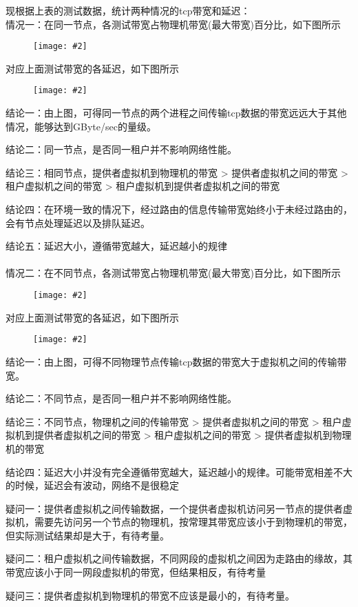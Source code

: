 \documentclass[a4paper,left=1.5cm,right=1.5cm,11pt]{article}
\newcommand{\sizedfic}[2]{\begin{figure}[H]
		\center
		\texttt{[image: \#2]}
	\end{figure}}
\begin{document}
现根据上表的测试数据，统计两种情况的tcp带宽和延迟：\\
情况一：在同一节点，各测试带宽占物理机带宽(最大带宽)百分比，如下图所示\\
\sizedfic{0.9}{tcp_bw_1.png}
对应上面测试带宽的各延迟，如下图所示\\
\sizedfic{0.9}{tcp_lat_1.png}
结论一：由上图，可得同一节点的两个进程之间传输tcp数据的带宽远远大于其他情况，能够达到GByte/sec的量级。\par
结论二：同一节点，是否同一租户并不影响网络性能。\par
结论三：相同节点，提供者虚拟机到物理机的带宽 > 提供者虚拟机之间的带宽 > 租户虚拟机之间的带宽 > 租户虚拟机到提供者虚拟机之间的带宽 \par
结论四：在环境一致的情况下，经过路由的信息传输带宽始终小于未经过路由的，会有节点处理延迟以及排队延迟。\par
结论五：延迟大小，遵循带宽越大，延迟越小的规律\\\\
情况二：在不同节点，各测试带宽占物理机带宽(最大带宽)百分比，如下图所示\\
\sizedfic{0.9}{tcp_bw_2.png}
对应上面测试带宽的各延迟，如下图所示\\
\sizedfic{0.9}{tcp_lat_2.png}
结论一：由上图，可得不同物理节点传输tcp数据的带宽大于虚拟机之间的传输带宽。\par
结论二：不同节点，是否同一租户并不影响网络性能。\par
结论三：不同节点，物理机之间的传输带宽 > 提供者虚拟机之间的带宽 > 租户虚拟机到提供者虚拟机之间的带宽 > 
租户虚拟机之间的带宽 > 提供者虚拟机到物理机的带宽 \par
结论四：延迟大小并没有完全遵循带宽越大，延迟越小的规律。可能带宽相差不大的时候，延迟会有波动，网络不是很稳定\par
疑问一：提供者虚拟机之间传输数据，一个提供者虚拟机访问另一节点的提供者虚拟机，需要先访问另一个节点的物理机，按常理其带宽应该小于到物理机的带宽，但实际测试结果却是大于，有待考量。\par
疑问二：租户虚拟机之间传输数据，不同网段的虚拟机之间因为走路由的缘故，其带宽应该小于同一网段虚拟机的带宽，但结果相反，有待考量 \par
疑问三：提供者虚拟机到物理机的带宽不应该是最小的，有待考量。
\end{document}
